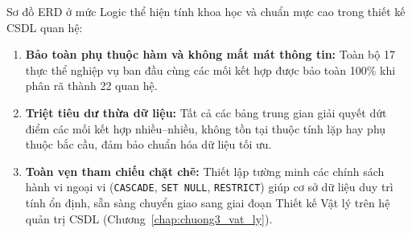 Sơ đồ ERD ở mức Logic thể hiện tính khoa học và chuẩn mực cao trong thiết kế CSDL quan hệ:
\begin{enumerate}
    \item \textbf{Bảo toàn phụ thuộc hàm và không mất mát thông tin:} Toàn bộ 17 thực thể nghiệp vụ ban đầu cùng các mối kết hợp được bảo toàn 100\% khi phân rã thành 22 quan hệ.
    \item \textbf{Triệt tiêu dư thừa dữ liệu:} Tất cả các bảng trung gian giải quyết dứt điểm các mối kết hợp nhiều--nhiều, không tồn tại thuộc tính lặp hay phụ thuộc bắc cầu, đảm bảo chuẩn hóa dữ liệu tối ưu.
    \item \textbf{Toàn vẹn tham chiếu chặt chẽ:} Thiết lập tường minh các chính sách hành vi ngoại vi (\texttt{CASCADE}, \texttt{SET NULL}, \texttt{RESTRICT}) giúp cơ sở dữ liệu duy trì tính ổn định, sẵn sàng chuyển giao sang giai đoạn Thiết kế Vật lý trên hệ quản trị CSDL (Chương~\ref{chap:chuong3_vat_ly}).
\end{enumerate}
